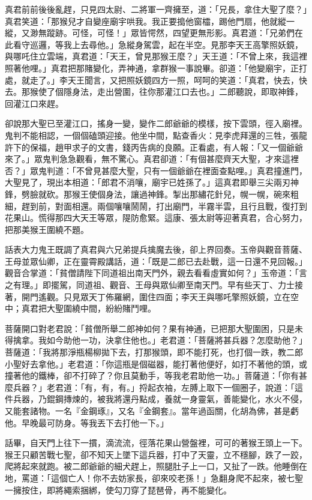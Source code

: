 真君前前後後亂趕，只見四太尉、二將軍一齊擁至，道：「兄長，拿住大聖了麼？」真君笑道：「那猴兒才自變座廟宇哄我。我正要搗他窗櫺，踢他門扇，他就縱一縱，又渺無蹤跡。可怪，可怪！」眾皆愕然，四望更無形影。真君道：「兄弟們在此看守巡邏，等我上去尋他。」急縱身駕雲，起在半空。見那李天王高擎照妖鏡，與哪吒住立雲端，真君道：「天王，曾見那猴王麼？」天王道：「不曾上來，我這裡照著他哩。」真君把那賭變化，弄神通，拿群猴一事說畢。卻道：「他變廟宇，正打處，就走了。」李天王聞言，又把照妖鏡四方一照，呵呵的笑道：「真君，快去，快去。那猴使了個隱身法，走出營圍，往你那灌江口去也。」二郎聽說，即取神鋒，回灌江口來趕。

卻說那大聖已至灌江口，搖身一變，變作二郎爺爺的模樣，按下雲頭，徑入廟裡。鬼判不能相認，一個個磕頭迎接。他坐中間，點查香火：見李虎拜還的三牲，張龍許下的保福，趙甲求子的文書，錢丙告病的良願。正看處，有人報：「又一個爺爺來了。」眾鬼判急急觀看，無不驚心。真君卻道：「有個甚麼齊天大聖，才來這裡否？」眾鬼判道：「不曾見甚麼大聖，只有一個爺爺在裡面查點哩。」真君撞進門，大聖見了，現出本相道：「郎君不消嚷，廟宇已姓孫了。」這真君即舉三尖兩刃神鋒，劈臉就砍。那猴王使個身法，讓過神鋒。掣出那繡花針兒，幌一幌，碗來粗細，趕到前，對面相還。兩個嚷嚷鬧鬧，打出廟門，半霧半雲，且行且戰，復打到花果山。慌得那四大天王等眾，隄防愈緊。這康、張太尉等迎著真君，合心努力，把那美猴王圍繞不題。

話表大力鬼王既調了真君與六兄弟提兵擒魔去後，卻上界回奏。玉帝與觀音菩薩、王母並眾仙卿，正在靈霄殿講話，道：「既是二郎已去赴戰，這一日還不見回報。」觀音合掌道：「貧僧請陛下同道祖出南天門外，親去看看虛實如何？」玉帝道：「言之有理。」即擺駕，同道祖、觀音、王母與眾仙卿至南天門。早有些天丁、力士接著，開門遙觀。只見眾天丁佈羅網，圍住四面；李天王與哪吒擎照妖鏡，立在空中；真君把大聖圍繞中間，紛紛賭鬥哩。

菩薩開口對老君說：「貧僧所舉二郎神如何？果有神通，已把那大聖圍困，只是未得擒拿。我如今助他一功，決拿住他也。」老君道：「菩薩將甚兵器？怎麼助他？」菩薩道：「我將那淨瓶楊柳拋下去，打那猴頭，即不能打死，也打個一跌，教二郎小聖好去拿他。」老君道：「你這瓶是個磁器，能打著他便好，如打不著他的頭，或撞著他的鐵棒，卻不打碎了？你且莫動手，等我老君助他一功。」菩薩道：「你有甚麼兵器？」老君道：「有，有，有。」捋起衣袖，左膊上取下一個圈子，說道：「這件兵器，乃錕鋼摶煉的，被我將還丹點成，養就一身靈氣，善能變化，水火不侵，又能套諸物。一名『金鋼琢』，又名『金鋼套』。當年過函關，化胡為佛，甚是虧他。早晚最可防身。等我丟下去打他一下。」

話畢，自天門上往下一摜，滴流流，徑落花果山營盤裡，可可的著猴王頭上一下。猴王只顧苦戰七聖，卻不知天上墜下這兵器，打中了天靈，立不穩腳，跌了一跤，爬將起來就跑。被二郎爺爺的細犬趕上，照腿肚子上一口，又扯了一跌。他睡倒在地，罵道：「這個亡人！你不去妨家長，卻來咬老孫！」急翻身爬不起來，被七聖一擁按住，即將繩索捆綁，使勾刀穿了琵琶骨，再不能變化。

